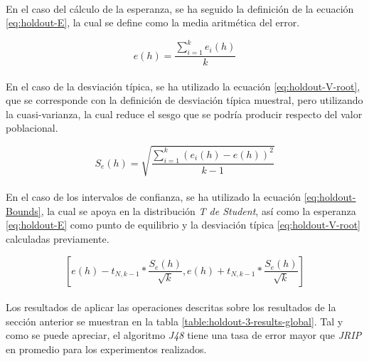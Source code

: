 \documentclass{article}
\begin{document}
		\paragraph{}
		En el caso del cálculo de la esperanza, se ha seguido la definición de la ecuación \eqref{eq:holdout-E}, la cual se define como la media aritmética del error.

		\begin{equation}
		\label{eq:holdout-E}
				e(h) = \frac{\sum_{i=1}^k e_i(h)}{k}
		\end{equation}

		\paragraph{}
		En el caso de la desviación típica, se ha utilizado la ecuación \eqref{eq:holdout-V-root}, que se corresponde con la definición de desviación típica muestral, pero utilizando la cuasi-varianza, la cual reduce el sesgo que se podría producir respecto del valor poblacional.

		\begin{equation}
		\label{eq:holdout-V-root}
				S_e(h) = \sqrt{\frac{\sum_{i=1}^k (e_i(h)-e(h))^2}{k-1}}
		\end{equation}


		\paragraph{}
		En el caso de los intervalos de confianza, se ha utilizado la ecuación \eqref{eq:holdout-Bounds}, la cual se apoya en la distribución \emph{T de Student}, así como la esperanza \eqref{eq:holdout-E} como punto de equilibrio y la desviación típica \eqref{eq:holdout-V-root} calculadas previamente.

		\begin{equation}
		\label{eq:holdout-Bounds}
			[e(h)-t_{N, k-1} * \frac{S_e(h)}{\sqrt{k}},e(h)+t_{N, k-1} * \frac{S_e(h)}{\sqrt{k}}]
		\end{equation}

		\paragraph{}
		Los resultados de aplicar las operaciones descritas sobre los resultados de la sección anterior se muestran en la tabla \ref{table:holdout-3-results-global}. Tal y como se puede apreciar, el algoritmo \emph{J48} tiene una tasa de error mayor que \emph{JRIP} en promedio para los experimentos realizados.
\end{document}
